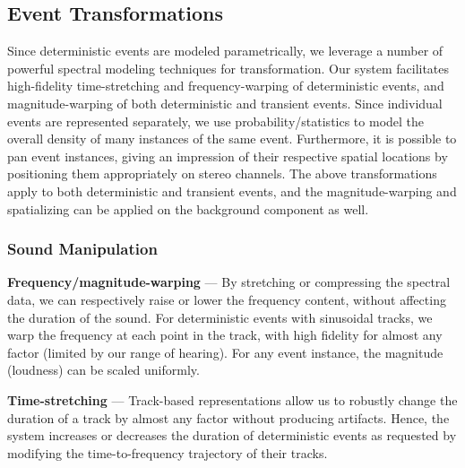 \documentclass{acmsiggraph}               %
\begin{document}
\subsection{Event Transformations}

Since deterministic events are modeled parametrically, we leverage 
a number of powerful spectral modeling techniques for transformation. Our system 
facilitates high-fidelity time-stretching and frequency-warping of 
deterministic events, and magnitude-warping of both deterministic and 
transient events. Since individual events are represented separately, we 
use probability/statistics to model the overall density of many instances 
of the same event. 
Furthermore, it is possible to pan event instances, giving an impression 
of their respective spatial locations by positioning them appropriately 
on stereo channels. The above transformations apply to both 
deterministic and transient events, and the magnitude-warping and 
spatializing can be applied on the background component as well. 

\subsubsection{Sound Manipulation}

\textbf{Frequency/magnitude-warping} --- By stretching or compressing the spectral
data, we can respectively raise or lower the frequency content, without 
affecting the duration of the sound.  For deterministic events with sinusoidal tracks, 
we warp the frequency at each point in the track, with high fidelity for almost any factor 
(limited by our range of hearing).  
For any event instance, the magnitude (loudness) can be scaled uniformly.

\textbf{Time-stretching} --- Track-based representations allow us to 
robustly change the duration of a track by almost any factor without 
producing artifacts. Hence, the system increases or decreases the 
duration of deterministic events as requested by modifying the time-to-frequency trajectory of their tracks.
\end{document}
